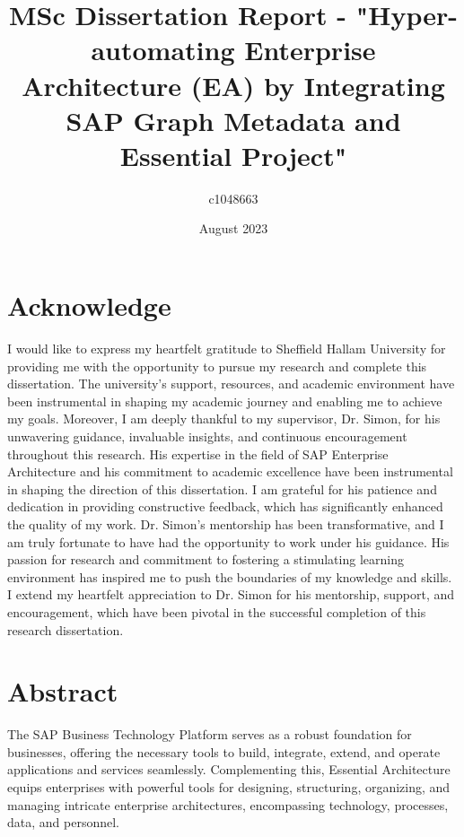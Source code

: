 \documentclass{article}
\title{MSc Dissertation Report - "Hyper-automating Enterprise Architecture (EA) by Integrating SAP Graph Metadata and Essential Project"}
\author{c1048663}
\date{August 2023}
\begin{document}
\maketitle
\section*{Acknowledge}
I would like to express my heartfelt gratitude to Sheffield Hallam University for providing me with the opportunity to pursue my research and complete this dissertation. The university's support, resources, and academic environment have been instrumental in shaping my academic journey and enabling me to achieve my goals.
Moreover, I am deeply thankful to my supervisor, Dr. Simon, for his unwavering guidance, invaluable insights, and continuous encouragement throughout this research. His expertise in the field of SAP Enterprise Architecture and his commitment to academic excellence have been instrumental in shaping the direction of this dissertation. I am grateful for his patience and dedication in providing constructive feedback, which has significantly enhanced the quality of my work.
Dr. Simon's mentorship has been transformative, and I am truly fortunate to have had the opportunity to work under his guidance. His passion for research and commitment to fostering a stimulating learning environment has inspired me to push the boundaries of my knowledge and skills.
I extend my heartfelt appreciation to Dr. Simon for his mentorship, support, and encouragement, which have been pivotal in the successful completion of this research dissertation.

\newpage
\maketitle
\section*{Abstract}
The SAP Business Technology Platform serves as a robust foundation for businesses, offering the necessary tools to build, integrate, extend, and operate applications and services seamlessly. Complementing this, Essential Architecture equips enterprises with powerful tools for designing, structuring, organizing, and managing intricate enterprise architectures, encompassing technology, processes, data, and personnel.
\end{document}
